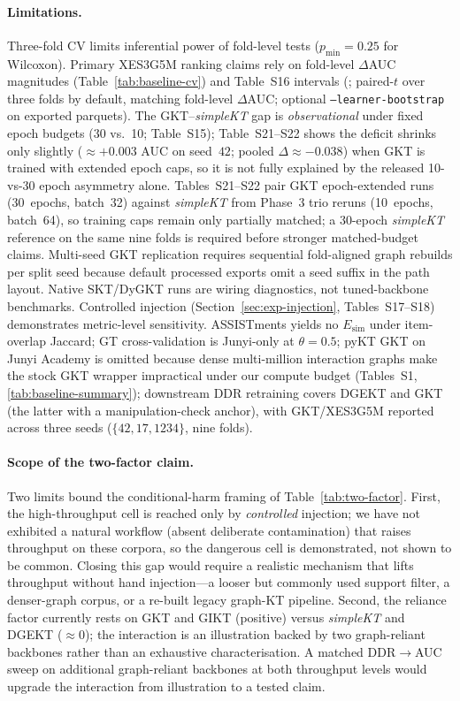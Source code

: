 \documentclass[pdflatex,sn-mathphys-num]{sn-jnl}
\newcommand{\Esim}{\ensuremath{E_{\text{sim}}}}
\newcommand{\DDR}{\textsc{DDR}}
\newcommand{\GKTthirtydeltavec}{-0.038}
\newcommand{\GKTepochgain}{+0.003}
\begin{document}
\paragraph{Limitations.}
Three-fold CV limits inferential power of fold-level tests ($p_{\min}{=}0.25$ for
Wilcoxon). Primary XES3G5M ranking claims rely on fold-level $\Delta$AUC
magnitudes (Table~\ref{tab:baseline-cv}) and Table~S16 intervals
(; paired-$t$ over three folds by default,
matching fold-level $\Delta$AUC; optional \texttt{--learner-bootstrap} on
exported parquets). The GKT--\textit{simpleKT}
gap is \emph{observational} under fixed epoch budgets (30 vs.\ 10; Table~S15);
Table~S21--S22 shows the deficit shrinks only slightly (${\approx}\GKTepochgain{}$ AUC
on seed~$42$; pooled $\Delta{\approx}\GKTthirtydeltavec{}$) when GKT is trained
with extended epoch caps, so it is not fully explained by the released 10-vs-30
epoch asymmetry alone.
Tables~S21--S22 pair GKT epoch-extended runs (30~epochs, batch~32) against
\textit{simpleKT} from Phase~3 trio reruns (10~epochs, batch~64), so training
caps remain only partially matched; a 30-epoch \textit{simpleKT} reference on
the same nine folds is required before stronger matched-budget claims.
Multi-seed GKT replication requires
sequential fold-aligned graph rebuilds per split seed because default processed
exports omit a seed suffix in the path layout. Native SKT/DyGKT runs
are wiring diagnostics, not tuned-backbone benchmarks. Controlled injection
(Section~\ref{sec:exp-injection}, Tables~S17--S18) demonstrates metric-level
sensitivity. ASSISTments yields no $\Esim$ under item-overlap Jaccard; GT
cross-validation is Junyi-only at $\theta{=}0.5$; pyKT GKT on Junyi Academy
is omitted because dense multi-million interaction graphs make the stock GKT
wrapper impractical under our compute budget (Tables~S1, \ref{tab:baseline-summary});
downstream \DDR{} retraining covers DGEKT and GKT (the latter with a
manipulation-check anchor), with GKT/XES3G5M reported across three seeds
($\{42,17,1234\}$, nine folds).

\paragraph{Scope of the two-factor claim.}
Two limits bound the conditional-harm framing of Table~\ref{tab:two-factor}.
First, the high-throughput cell is reached only by \emph{controlled} injection;
we have not exhibited a natural workflow (absent deliberate contamination) that
raises throughput on these corpora, so the dangerous cell is demonstrated, not
shown to be common. Closing this gap would require a realistic mechanism that
lifts throughput without hand injection---a looser but commonly used support
filter, a denser-graph corpus, or a re-built legacy graph-KT pipeline. Second,
the reliance factor currently rests on GKT and GIKT (positive) versus
\textit{simpleKT} and DGEKT (${\approx}0$); the interaction is an illustration
backed by two graph-reliant backbones rather than an exhaustive
characterisation. A matched \DDR{}$\to$AUC sweep on additional graph-reliant
backbones at both throughput levels would upgrade the interaction from
illustration to a tested claim.
\end{document}
